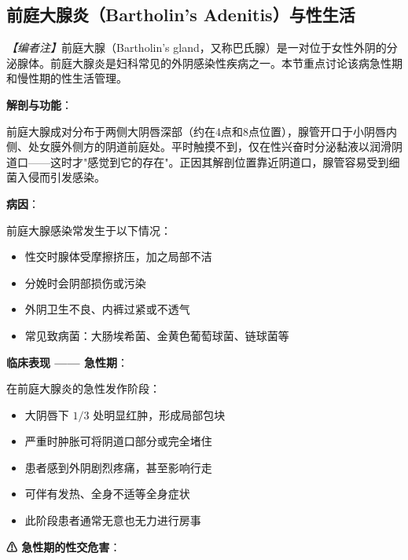 \subsection{前庭大腺炎（Bartholin's Adenitis）与性生活}

\noindent\textit{【编者注】}前庭大腺（Bartholin's gland，又称巴氏腺）是一对位于女性外阴的分泌腺体。前庭大腺炎是妇科常见的外阴感染性疾病之一。本节重点讨论该病急性期和慢性期的性生活管理。

\vspace{0.5em}
\noindent\textbf{解剖与功能}：

前庭大腺成对分布于两侧大阴唇深部（约在4点和8点位置），腺管开口于小阴唇内侧、处女膜外侧方的阴道前庭处。平时触摸不到，仅在性兴奋时分泌黏液以润滑阴道口——这时才"感觉到它的存在"。正因其解剖位置靠近阴道口，腺管容易受到细菌入侵而引发感染。

\vspace{0.5em}
\noindent\textbf{病因}：

前庭大腺感染常发生于以下情况：
\begin{itemize}
	\item 性交时腺体受摩擦挤压，加之局部不洁
	\item 分娩时会阴部损伤或污染
	\item 外阴卫生不良、内裤过紧或不透气
	\item 常见致病菌：大肠埃希菌、金黄色葡萄球菌、链球菌等
\end{itemize}

\vspace{0.5em}
\noindent\textbf{临床表现 —— 急性期}：

在前庭大腺炎的急性发作阶段：
\begin{itemize}
	\item 大阴唇下 $1/3$ 处明显红肿，形成局部包块
	\item 严重时肿胀可将阴道口部分或完全堵住
	\item 患者感到外阴剧烈疼痛，甚至影响行走
	\item 可伴有发热、全身不适等全身症状
	\item 此阶段患者通常无意也无力进行房事
\end{itemize}

\noindent\textbf{⚠ 急性期的性交危害}：

